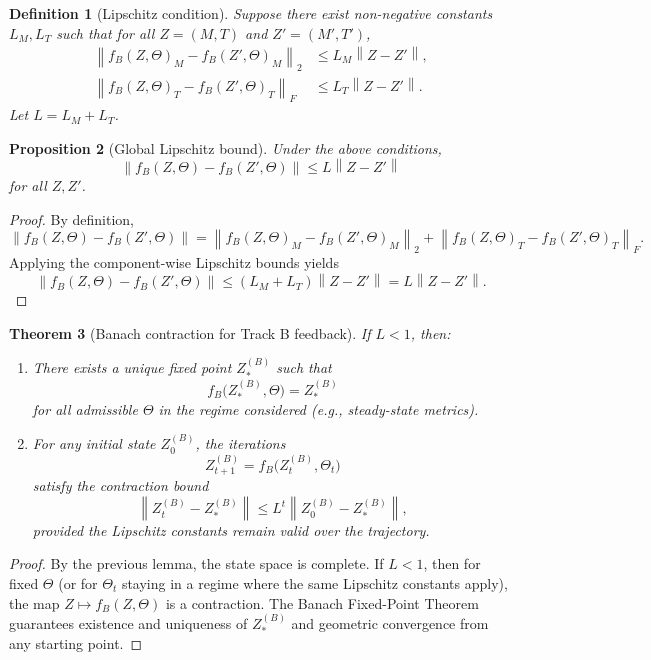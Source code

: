 \documentclass[11pt]{article}
\newtheorem{definition}{Definition}[section]
\newtheorem{theorem}[definition]{Theorem}
\newtheorem{proposition}[definition]{Proposition}
\newcommand{\norm}[1]{\left\lVert #1 \right\rVert}
\begin{document}
\begin{definition}[Lipschitz condition]
Suppose there exist non-negative constants \(L_M,L_T\) such that for all \(Z = (M,T)\) and \(Z' = (M',T')\),
\begin{align*}
  \norm{f_B(Z,\Theta)_M - f_B(Z',\Theta)_M}_2 &\le L_M \norm{Z-Z'}, \\
  \norm{f_B(Z,\Theta)_T - f_B(Z',\Theta)_T}_F &\le L_T \norm{Z-Z'}.
\end{align*}
Let \(L = L_M + L_T\).
\end{definition}

\begin{proposition}[Global Lipschitz bound]
Under the above conditions,
\[
  \norm{f_B(Z,\Theta) - f_B(Z',\Theta)} \le L \norm{Z - Z'}
\]
for all \(Z,Z'\).
\end{proposition}

\begin{proof}
By definition,
\[
  \norm{f_B(Z,\Theta) - f_B(Z',\Theta)}
  = \norm{f_B(Z,\Theta)_M - f_B(Z',\Theta)_M}_2
    + \norm{f_B(Z,\Theta)_T - f_B(Z',\Theta)_T}_F.
\]
Applying the component-wise Lipschitz bounds yields
\[
  \norm{f_B(Z,\Theta) - f_B(Z',\Theta)}
  \le (L_M + L_T) \norm{Z-Z'} = L \norm{Z-Z'}.
\]
\end{proof}

\begin{theorem}[Banach contraction for Track B feedback]
If \(L < 1\), then:
\begin{enumerate}
  \item There exists a unique fixed point \(Z_\ast^{(B)}\) such that
  \[
    f_B\bigl(Z_\ast^{(B)},\Theta\bigr) = Z_\ast^{(B)}
  \]
  for all admissible \(\Theta\) in the regime considered (e.g., steady-state metrics).
  \item For any initial state \(Z_0^{(B)}\), the iterations
  \[
    Z_{t+1}^{(B)} = f_B\bigl(Z_t^{(B)},\Theta_t\bigr)
  \]
  satisfy the contraction bound
  \[
    \norm{Z_t^{(B)} - Z_\ast^{(B)}} \le L^t \norm{Z_0^{(B)} - Z_\ast^{(B)}},
  \]
  provided the Lipschitz constants remain valid over the trajectory.
\end{enumerate}
\end{theorem}

\begin{proof}
By the previous lemma, the state space is complete.
If \(L<1\), then for fixed \(\Theta\) (or for \(\Theta_t\) staying in a regime where the same Lipschitz constants apply), the map \(Z \mapsto f_B(Z,\Theta)\) is a contraction.
The Banach Fixed-Point Theorem guarantees existence and uniqueness of \(Z_\ast^{(B)}\) and geometric convergence from any starting point.
\end{proof}
\end{document}
